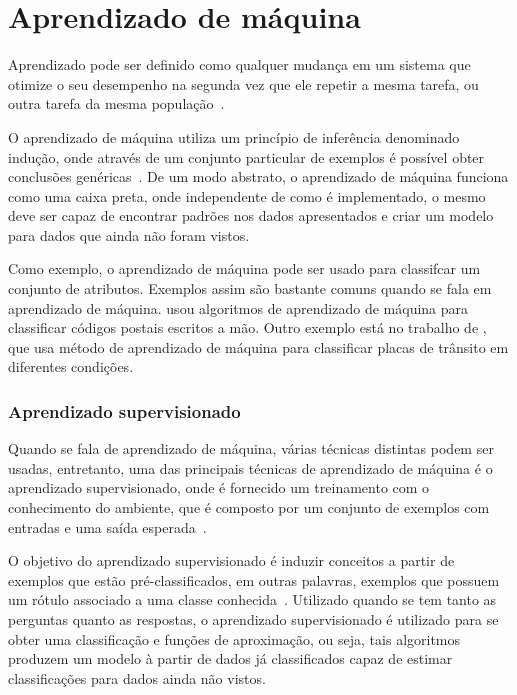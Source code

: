 \chapter{Aprendizado de máquina}

Aprendizado pode ser definido como qualquer mudança em um sistema que
otimize o seu desempenho na segunda vez que ele repetir a mesma tarefa,
ou outra tarefa da mesma população~\cite{custodio2010aprendizadomaquina}.

O aprendizado de máquina utiliza um princípio de inferência denominado
indução, onde através de um conjunto particular de exemplos é possível
obter conclusões genéricas~\cite{bruno2010aprendizadomaquina}. De um modo
abstrato, o aprendizado de máquina funciona como uma caixa preta, onde
independente de como é implementado, o mesmo deve ser capaz de encontrar padrões
nos dados apresentados e criar um modelo para dados que ainda não foram vistos.

Como exemplo, o aprendizado de máquina pode ser usado para classifcar
um conjunto de atributos. Exemplos assim são bastante comuns quando se fala em
aprendizado de máquina.  usou algoritmos de
aprendizado de máquina para classificar códigos postais escritos a mão. Outro
exemplo está no trabalho de , que usa método de
aprendizado de máquina para classificar placas de trânsito em diferentes
condições.


\subsection{Aprendizado supervisionado}

Quando se fala de aprendizado de máquina, várias técnicas distintas podem ser
usadas, entretanto, uma das principais técnicas de aprendizado de máquina é o aprendizado
supervisionado, onde é fornecido um treinamento com o conhecimento do
ambiente, que é composto por um conjunto de exemplos com entradas
e uma saída esperada~\cite{bruno2010aprendizadomaquina}.

O objetivo do aprendizado supervisionado é induzir conceitos a partir de
exemplos que estão pré-classificados, em outras palavras, exemplos que
possuem um rótulo associado a uma classe conhecida~\cite{bruno2010aprendizadomaquina}.
Utilizado quando se tem tanto as perguntas quanto as respostas, o aprendizado
supervisionado é utilizado para se obter uma classificação e funções de aproximação, ou seja,
tais algoritmos produzem um modelo à partir de dados já classificados capaz de estimar classificações
para dados ainda não vistos.

